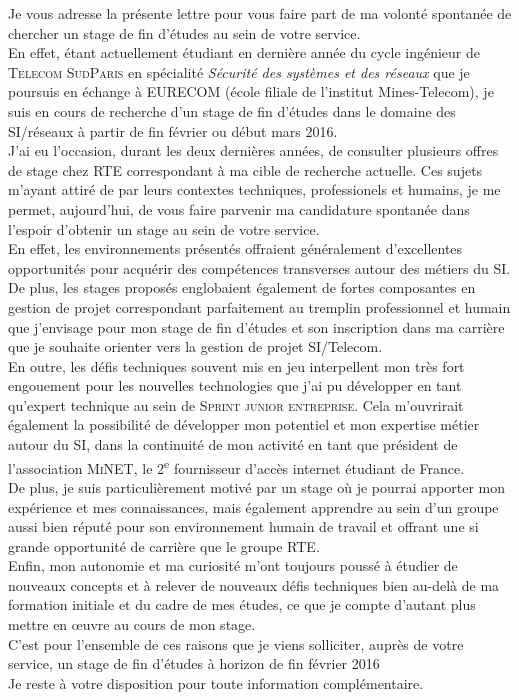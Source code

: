 \documentclass[10pt,a4paper,roman]{moderncv} %
\begin{document}
\quad \quad Je vous adresse la présente lettre pour vous faire part de ma volonté spontanée de chercher un stage de fin d'études au sein de votre
service.\\[0.3cm]
\quad \quad En effet, étant actuellement étudiant en dernière année du cycle ingénieur de \textsc{Telecom SudParis} en spécialité
\textit{Sécurité des systèmes et des réseaux} que je poursuis en échange à EURECOM (école filiale de l'institut Mines-Telecom), je suis en cours
de recherche d'un stage de fin d'études dans le domaine des SI/réseaux à partir de fin février ou début mars 2016.\\[0.3cm]
\quad \quad J'ai eu l'occasion, durant les deux dernières années, de consulter plusieurs offres de stage chez RTE correspondant à ma cible de recherche actuelle.
Ces sujets m'ayant attiré de par leurs contextes techniques, professionels et humains, je me permet, aujourd'hui, de vous
faire parvenir ma candidature spontanée dans l'espoir d'obtenir un stage au sein de votre service.\\
En effet, les environnements présentés offraient généralement d'excellentes opportunités pour acquérir des compétences transverses autour des
métiers du SI. De plus, les stages proposés englobaient également de fortes composantes en gestion de projet correspondant parfaitement au tremplin
professionnel et humain que j’envisage pour mon stage de fin d’études et son inscription dans ma carrière que je souhaite orienter vers la
gestion de projet SI/Telecom.\\
En outre, les défis techniques souvent mis en jeu interpellent mon très fort engouement pour les nouvelles technologies que j'ai pu
développer en tant qu'expert technique au sein de \textsc{Sprint junior entreprise}. Cela m'ouvrirait également la possibilité de développer mon
potentiel et mon expertise métier autour du SI, dans la continuité de mon activité en tant que président de l'association \textsc{MiNET},
le 2\textsuperscript{e} fournisseur d'accès internet étudiant de France.\\
De plus, je suis particulièrement motivé par un stage où je pourrai apporter mon expérience et mes connaissances, mais également
apprendre au sein d'un groupe aussi bien réputé pour son environnement humain de travail et offrant une si grande opportunité
de carrière que le groupe \textsc{RTE}.\\
Enfin, mon autonomie et ma curiosité m'ont toujours poussé à étudier de nouveaux concepts et à relever de nouveaux défis techniques bien au-delà de ma
formation initiale et du cadre de mes études, ce que je compte d'autant plus mettre en \oe uvre au cours de mon stage.\\
C'est pour l'ensemble de ces raisons que je viens solliciter, auprès de votre service, un stage de fin d'études à horizon de fin février 2016\\[0.3cm]
Je reste à votre disposition pour toute information complémentaire. \\[1cm]

\makeletterclosing %

\end{document}
